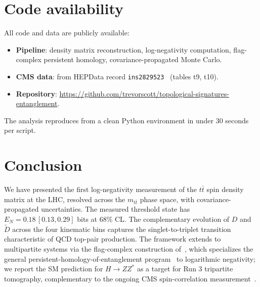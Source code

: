 \documentclass[11pt,a4paper]{article}
\theoremstyle{definition}
\begin{document}
\section{Code availability}\label{sec:code}

All code and data are publicly available:

\begin{itemize}
\item \textbf{Pipeline}: density matrix reconstruction, log-negativity computation, flag-complex persistent homology, covariance-propagated Monte Carlo.
\item \textbf{CMS data}: from HEPData record \texttt{ins2829523}~\cite{CMS2024data} (tables t9, t10).
\item \textbf{Repository}: \url{https://github.com/trevorscott/topological-signatures-entanglement}.
\end{itemize}

The analysis reproduces from a clean Python environment in under 30 seconds per script.

\section{Conclusion}

We have presented the first log-negativity measurement of the $t\bar{t}$ spin density matrix at the LHC, resolved across the $m_{t\bar{t}}$ phase space, with covariance-propagated uncertainties. The measured threshold state has $E_N = 0.18\,[0.13, 0.29]$ bits at 68\% CL. The complementary evolution of $D$ and $\tilde{D}$ across the four kinematic bins captures the singlet-to-triplet transition characteristic of QCD top-pair production. The framework extends to multipartite systems via the flag-complex construction of~\cite{Scott2026RWF}, which specializes the general persistent-homology-of-entanglement program~\cite{DiPierro2018, Olsthoorn2023, HamiltonLeditzky2024} to logarithmic negativity; we report the SM prediction for $H \to ZZ^*$ as a target for Run 3 tripartite tomography, complementary to the ongoing CMS spin-correlation measurement~\cite{CMS-HIG-25-011}.
\end{document}
